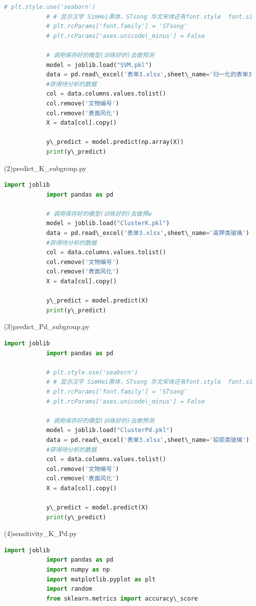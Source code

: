 \documentclass[withoutpreface,bwprint]{cumcmthesis}
\begin{document}
\begin{appendices}
\begin{lstlisting}[language=Python]
			# plt.style.use('seaborn')
			# # 显示汉字 SimHei黑体，STsong 华文宋体还有font.style  font.size等
			# plt.rcParams['font.family'] = 'STsong'
			# plt.rcParams['axes.unicode\_minus'] = False
			
			# 调用保存好的模型(训练好的)去做预测
			model = joblib.load("SVM.pkl")
			data = pd.read\_excel('表单3.xlsx',sheet\_name='归一化的表单3')
			#获得待分析的数据
			col = data.columns.values.tolist()
			col.remove('文物编号')
			col.remove('表面风化')
			X = data[col].copy()
			
			y\_predict = model.predict(np.array(X))
			print(y\_predict)
		\end{lstlisting}

		(2)predict\_K\_subgroup.py 
		\begin{lstlisting}[language=Python]
			import joblib
			import pandas as pd
			
			# 调用保存好的模型(训练好的)去做预w
			model = joblib.load("ClusterK.pkl")
			data = pd.read\_excel('表单3.xlsx',sheet\_name='高钾类玻璃')
			#获得待分析的数据
			col = data.columns.values.tolist()
			col.remove('文物编号')
			col.remove('表面风化')
			X = data[col].copy()
			
			y\_predict = model.predict(X)
			print(y\_predict)
		\end{lstlisting}

		(3)predict\_Pd\_subgroup.py 
		\begin{lstlisting}[language=Python]
			import joblib
			import pandas as pd
			
			# plt.style.use('seaborn')
			# # 显示汉字 SimHei黑体，STsong 华文宋体还有font.style  font.size等
			# plt.rcParams['font.family'] = 'STsong'
			# plt.rcParams['axes.unicode\_minus'] = False
			
			# 调用保存好的模型(训练好的)去做预测
			model = joblib.load("ClusterPd.pkl")
			data = pd.read\_excel('表单3.xlsx',sheet\_name='铅钡类玻璃')
			#获得待分析的数据
			col = data.columns.values.tolist()
			col.remove('文物编号')
			col.remove('表面风化')
			X = data[col].copy()
			
			y\_predict = model.predict(X)
			print(y\_predict)
		\end{lstlisting}

		(4)sensitivity\_K\_Pd.py 
		\begin{lstlisting}[language=Python]
			import joblib
			import pandas as pd
			import numpy as np
			import matplotlib.pyplot as plt
			import random
			from sklearn.metrics import accuracy\_score
			

\end{lstlisting}
\end{appendices}
\end{document}
